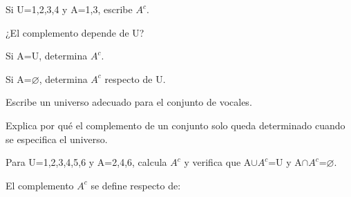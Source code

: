 \begin{activity}[id=dia-16-corta-02,type=short,weight=1]

Si U={1,2,3,4} y A={1,3}, escribe \(A^{c}\).

\end{activity}

\begin{activity}[id=dia-16-corta-03,type=short,weight=1]

¿El complemento depende de U?

\end{activity}

\begin{activity}[id=dia-16-corta-04,type=short,weight=1]

Si A=U, determina \(A^{c}\).

\end{activity}

\begin{activity}[id=dia-16-corta-05,type=short,weight=1]

Si A=\(\varnothing\), determina \(A^{c}\) respecto de U.

\end{activity}

\begin{activity}[id=dia-16-corta-06,type=short,weight=1]

Escribe un universo adecuado para el conjunto de vocales.

\end{activity}

\begin{activity}[id=dia-16-desarrollo-01,type=long,weight=2]

Explica por qué el complemento de un conjunto solo queda determinado cuando se especifica el universo.

\end{activity}

\begin{activity}[id=dia-16-desarrollo-02,type=long,weight=2]

Para U={1,2,3,4,5,6} y A={2,4,6}, calcula \(A^{c}\) y verifica que A\(\cup\)\(A^{c}\)=U y A\(\cap\)\(A^{c}\)=\(\varnothing\).

\end{activity}

\begin{activity}[id=dia-16-opcion-01,type=choice,weight=1]

El complemento \(A^{c}\) se define respecto de:





\end{activity}


